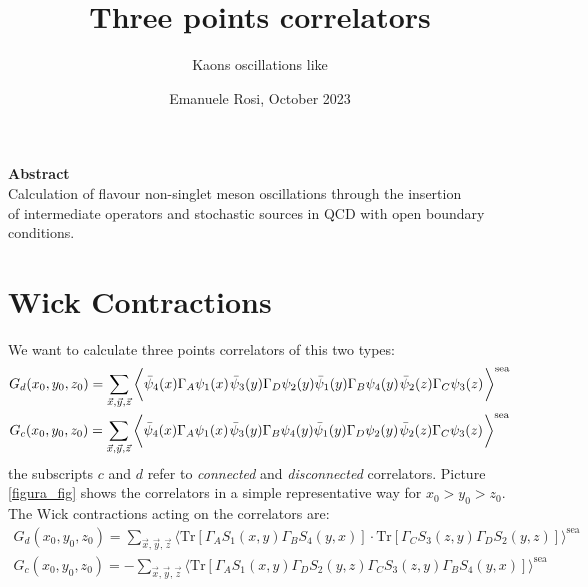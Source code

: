 \documentclass[11pt,a4paper]{article}
\begin{document}
\title{Three points correlators}
\author{Kaons oscillations like}
\date{Emanuele Rosi, October 2023}
\maketitle

\begin{center}
    {\bf Abstract}\\
    Calculation of flavour non-singlet meson oscillations through the insertion \\ of intermediate operators and stochastic sources in QCD with open boundary conditions.
\end{center}

\section{Wick Contractions}
We want to calculate three points correlators of this two types:
\begin{equation}
    \begin{gathered}
        G_d(x_0,y_0,z_0) = \sum_{\vec x, \vec y, \vec z} \bigg\langle
        \bar\psi_4(x) \Gamma_A \psi_1 (x)\hspace*{.3mm}
        \bar\psi_3(y) \Gamma_D \psi_2 (y) \bar\psi_1(y) \Gamma_B \psi_4 (y)\hspace*{.3mm}
        \bar\psi_2(z) \Gamma_C \psi_3 (z)\hspace*{.3mm}
        \bigg\rangle^{\text{sea}}\\
        G_c(x_0,y_0,z_0) = \sum_{\vec x, \vec y, \vec z} \bigg\langle
        \bar\psi_4(x) \Gamma_A \psi_1 (x)\hspace*{.3mm}
        \bar\psi_3(y) \Gamma_B \psi_4 (y) \bar\psi_1(y) \Gamma_D \psi_2 (y)\hspace*{.3mm}
        \bar\psi_2(z) \Gamma_C \psi_3 (z)\hspace*{.3mm}
        \bigg\rangle^{\text{sea}}\\
    \end{gathered}
\end{equation}
the subscripts $c$ and $d$ refer to {\it connected} and {\it disconnected} correlators.
Picture \ref{figura_fig} shows the correlators in a simple representative way for $x_0>y_0>z_0$.
The Wick contractions acting on the correlators are:
\begin{equation}\label{eq:contractions}
    \begin{gathered}
        G_d(x_0,y_0,z_0) = \sum_{\vec x, \vec y, \vec z} \bigg\langle \text{Tr}\left[\Gamma_A S_1(x,y)\Gamma_B S_4(y,x)\right]\cdot\text{Tr}\left[\Gamma_C S_3(z,y)\Gamma_D S_2(y,z)\right] \bigg\rangle^{\text{sea}} \\
        G_c(x_0,y_0,z_0) = - \sum_{\vec x, \vec y, \vec z} \bigg\langle \text{Tr}\left[\Gamma_A S_1(x,y)\Gamma_D S_2(y,z)\Gamma_C S_3(z,y)\Gamma_B S_4(y,x)\right] \bigg\rangle^{\text{sea}}
    \end{gathered}
\end{equation}
\end{document}
